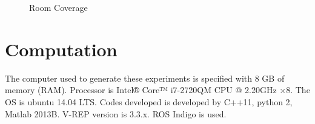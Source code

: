 \begin{figure}[!tbp]
  \centering
  \hfill
  \caption{Room Coverage}
  
  \label{fig:final_room}
  
\end{figure}

\hfill

\newpage

\section{Computation}
The computer used to generate these experiments is specified with 8 GB of memory (RAM). Processor is Intel® Core™ i7-2720QM CPU @ 2.20GHz ×8. 
The OS is ubuntu 14.04 LTS. Codes developed is developed by C++11, python 2, Matlab 2013B. V-REP version is 3.3.x. ROS Indigo is used.